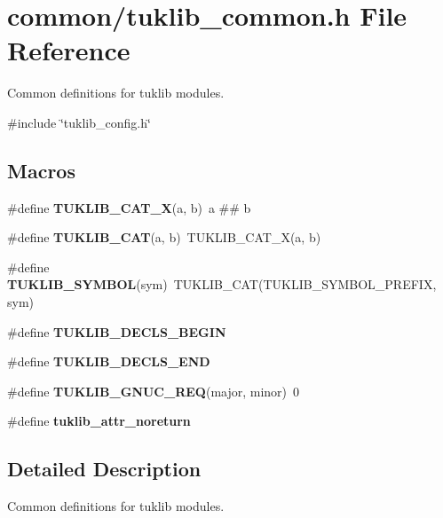 \section{common/tuklib\+\_\+common.h File Reference}
\label{tuklib__common_8h}


Common definitions for tuklib modules.  


{\ttfamily \#include \char`\"{}tuklib\+\_\+config.\+h\char`\"{}}\newline
\subsection*{Macros}
\begin{DoxyCompactItemize}
\item 
\mbox{\label{tuklib__common_8h_a8478e05dae8737dc11592c2788d11f90}} 
\#define {\bfseries T\+U\+K\+L\+I\+B\+\_\+\+C\+A\+T\+\_\+X}(a,  b)~a \#\# b
\item 
\mbox{\label{tuklib__common_8h_a248ea0f7af459d76fa18f480421e9889}} 
\#define {\bfseries T\+U\+K\+L\+I\+B\+\_\+\+C\+AT}(a,  b)~T\+U\+K\+L\+I\+B\+\_\+\+C\+A\+T\+\_\+X(a, b)
\item 
\mbox{\label{tuklib__common_8h_a73d9617a3efe9601ef5017ae3edcd0d2}} 
\#define {\bfseries T\+U\+K\+L\+I\+B\+\_\+\+S\+Y\+M\+B\+OL}(sym)~T\+U\+K\+L\+I\+B\+\_\+\+C\+AT(T\+U\+K\+L\+I\+B\+\_\+\+S\+Y\+M\+B\+O\+L\+\_\+\+P\+R\+E\+F\+IX, sym)
\item 
\mbox{\label{tuklib__common_8h_ab5023d03fa57f2c87a47dcbe2c1f09fa}} 
\#define {\bfseries T\+U\+K\+L\+I\+B\+\_\+\+D\+E\+C\+L\+S\+\_\+\+B\+E\+G\+IN}
\item 
\mbox{\label{tuklib__common_8h_a563a246f5a3c60ca4c93e67c8022974a}} 
\#define {\bfseries T\+U\+K\+L\+I\+B\+\_\+\+D\+E\+C\+L\+S\+\_\+\+E\+ND}
\item 
\mbox{\label{tuklib__common_8h_a4ffc6c3ba0aaf18054d134112a7271c2}} 
\#define {\bfseries T\+U\+K\+L\+I\+B\+\_\+\+G\+N\+U\+C\+\_\+\+R\+EQ}(major,  minor)~0
\item 
\mbox{\label{tuklib__common_8h_a7a86ab3b44072fe3421b321f74878910}} 
\#define {\bfseries tuklib\+\_\+attr\+\_\+noreturn}
\end{DoxyCompactItemize}


\subsection{Detailed Description}
Common definitions for tuklib modules. 

